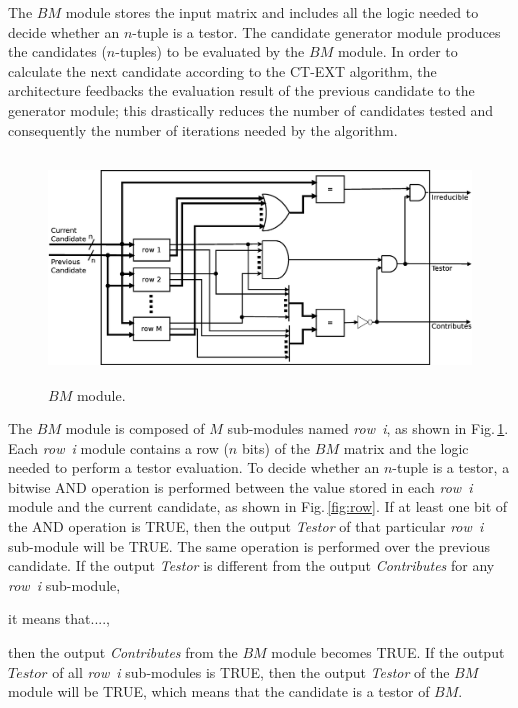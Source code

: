 \documentclass[authoryear,preprint,review,12pt]{elsarticle}
\begin{document}
The $BM$ module stores the input matrix and
includes all the logic needed to decide whether an $n$-tuple is a testor. The candidate
generator module produces the candidates ($n$-tuples) to be
evaluated by the $BM$ module. In order to calculate the next candidate
according to the CT-EXT algorithm, the architecture feedbacks the
evaluation result of the previous candidate to the generator module;
this drastically reduces the number of candidates tested and
consequently the number of iterations needed by the algorithm. 


\begin{figure}[htb]
    \begin{center}
        \includegraphics[height=6cm]{BM_module.eps}
    \end{center}
\caption{$BM$ module.}
\label{fig:4}
\end{figure}

The $BM$ module is composed of $M$ sub-modules named \textit{row~i}, as shown
in Fig.\,\ref{fig:4}. Each \textit{row~i} module contains a row ($n$ bits)
of the $BM$ matrix and the logic needed to perform a testor evaluation. To decide
whether an $n$-tuple is a testor, a bitwise AND operation is performed
between the value stored in each \textit{row~i} module and the current
candidate, as shown in Fig.\,\ref{fig:row}. If at least one bit of the AND operation is TRUE,
then the output \textit{Testor} of that particular \textit{row~i} sub-module
will be TRUE. The same operation is performed over the previous candidate.
If the output \textit{Testor} is different from
the output \textit{Contributes} for any \textit{row~i} sub-module, 

it means that...., 

then the output \textit{Contributes} from the $BM$ module becomes TRUE.
If the output $Testor$ of all  \textit{row~i} sub-modules is
TRUE, then the output \textit{Testor} of the $BM$ module will be TRUE,
which means that the candidate is a testor of $BM$.
\end{document}

